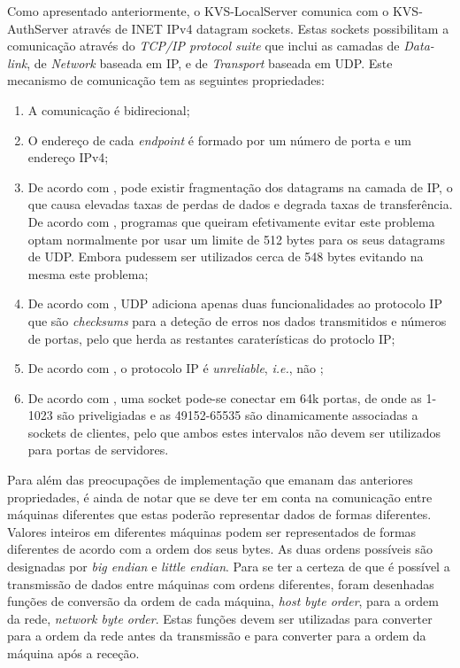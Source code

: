 Como apresentado anteriormente, o KVS-LocalServer comunica com o KVS-AuthServer através de INET IPv4 datagram sockets. Estas sockets possibilitam a comunicação através do \textit{TCP/IP protocol suite} que inclui as camadas de \textit{Data-link}, de \textit{Network} baseada em IP, e de \textit{Transport} baseada em UDP. Este mecanismo de comunicação tem as seguintes propriedades:
\begin{enumerate} [noitemsep]
    \item A comunicação é bidirecional;
    \item O endereço de cada \textit{endpoint} é formado por um número de porta e um endereço IPv4;
    \item De acordo com \parencite[1185-1186]{guia_linux}, pode existir fragmentação dos datagrams na camada de IP, o que causa elevadas taxas de perdas de dados e degrada taxas de transferência. De acordo com \parencite[1190]{guia_linux}, programas que queiram efetivamente evitar este problema optam normalmente por usar um limite de 512 bytes para os seus datagrams de UDP. Embora pudessem ser utilizados cerca de 548 bytes evitando na mesma este problema;
    \item De acordo com \parencite[1189]{guia_linux}, UDP adiciona apenas duas funcionalidades ao protocolo IP que são \textit{checksums} para a deteção de erros nos dados transmitidos e números de portas, pelo que herda as restantes caraterísticas do protoclo IP;
    \item De acordo com \parencite[1189]{guia_linux}, o protocolo IP é \textit{unreliable}, \textit{i.e.}, não ;
    \item De acordo com \cite{sockets}, uma socket pode-se conectar em 64k portas, de onde as 1-1023 são priveligiadas e as 49152-65535 são dinamicamente associadas a sockets de clientes, pelo que ambos estes intervalos não devem ser utilizados para portas de servidores.
\end{enumerate}
Para além das preocupações de implementação que emanam das anteriores propriedades, é ainda de notar que se deve ter em conta na comunicação entre máquinas diferentes que estas poderão representar dados de formas diferentes. Valores inteiros em diferentes máquinas podem ser representados de formas diferentes de acordo com a ordem dos seus bytes. As duas ordens possíveis são designadas por \textit{big endian} e \textit{little endian}. Para se ter a certeza de que é possível a transmissão de dados entre máquinas com ordens diferentes, foram desenhadas funções de conversão da ordem de cada máquina, \textit{host byte order}, para a ordem da rede, \textit{network byte order}. Estas funções devem ser utilizadas para converter para a ordem da rede antes da transmissão e para converter para a ordem da máquina após a receção.

